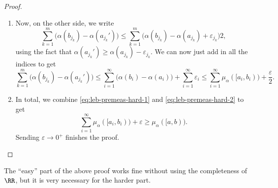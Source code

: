 \documentclass[../notes.tex]{subfiles}
\begin{document}
\begin{proof}
\begin{itemize}
\begin{enumerate}
			\item Now, on the other side, we write
			\[\sum_{k=1}^m\big(\alpha(b_{j_k})-\alpha(a_{j_k}')\big)\le\sum_{k=1}^m\big(\alpha(b_{j_k})-\alpha(a_{j_k})+\varepsilon_{j_k}\big)2,\]
			using the fact that $\alpha(a_{j_k}')\ge\alpha(a_{j_k})-\varepsilon_{j_k}$. We can now just add in all the indices to get
			\begin{equation}
				\sum_{k=1}^m\big(\alpha(b_{j_k})-\alpha(a_{j_k}')\big)\le\sum_{i=1}^\infty\big(\alpha(b_{i})-\alpha(a_{i})\big)+\sum_{i=1}^\infty\varepsilon_i\le\sum_{i=1}^\infty\mu_\alpha([a_i,b_{i}))+\frac\varepsilon2. \label{eq:leb-premeas-hard-2}
			\end{equation}
			
			\item In total, we combine \autoref{eq:leb-premeas-hard-1} and \autoref{eq:leb-premeas-hard-2} to get
			\[\sum_{i=1}^\infty\mu_\alpha([a_{i},b_{i}))+\varepsilon\ge\mu_\alpha([a,b)).\]
			Sending $\varepsilon\to0^+$ finishes the proof.
			\qedhere
		\end{enumerate}
	\end{itemize}
\end{proof}
\begin{remark}
	The ``easy'' part of the above proof works fine without using the completeness of $\RR$, but it is very necessary for the harder part.
\end{remark}
\end{document}
